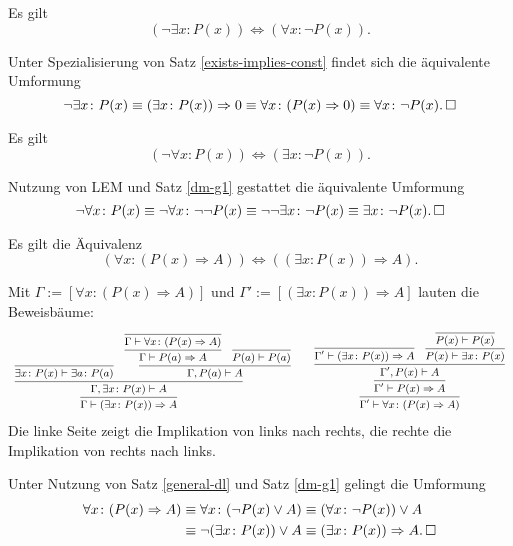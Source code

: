 \begin{Satz}%
\label{dm-g1} Es gilt
\[(\neg\exists x\colon P(x))\iff (\forall x\colon \neg P(x)).\]
\end{Satz}
\begin{Beweis} Unter Spezialisierung von Satz \ref{exists-implies-const}
findet sich die äquivalente Umformung%
\[\neg\exists x\colon P(x)\equiv (\exists x\colon P(x))\Rightarrow 0
\equiv \forall x\colon (P(x)\Rightarrow 0)
\equiv \forall x\colon \neg P(x).\,\square\]
\end{Beweis}
\begin{Satz}%
\label{dm-g2} Es gilt
\[(\neg\forall x\colon P(x))\iff (\exists x\colon \neg P(x)).\]
\end{Satz}
\begin{Beweis}
Nutzung von LEM und Satz \ref{dm-g1} gestattet die äquivalente
Umformung%
\[\neg\forall x\colon P(x)
\equiv\neg\forall x\colon \neg\neg P(x)
\equiv\neg\neg\exists x\colon \neg P(x)
\equiv\exists x\colon \neg P(x).\,\square\]
\end{Beweis}

\begin{Satz}\label{exists-implies-const}
Es gilt die Äquivalenz
\[(\forall x\colon (P(x)\Rightarrow A))
\iff ((\exists x\colon P(x))\Rightarrow A).\]
\end{Satz}
\begin{Beweis}[Beweis 1] Mit $\Gamma:=[\forall x\colon (P(x)\Rightarrow A)]$
und $\Gamma':=[(\exists x\colon P(x))\Rightarrow A]$
lauten die Beweisbäume:
\[\begin{array}{c@{\qquad}c}\small
\infer{\Gamma\vdash (\exists x\colon P(x))\Rightarrow A}{
  \infer{\Gamma,\exists x\colon P(x)\vdash A}{
    \infer{\exists x\colon P(x)\vdash\exists a\colon P(a)}{}
  & \infer{\Gamma,P(a)\vdash A}{
      \infer{\Gamma\vdash P(a)\Rightarrow A}{
        \infer{\Gamma\vdash\forall x\colon (P(x)\Rightarrow A)}{}}
    & \infer{P(a)\vdash P(a)}{}}}}
&\small
\infer{\Gamma'\vdash\forall x\colon (P(x)\Rightarrow A)}{
  \infer{\Gamma'\vdash P(x)\Rightarrow A}{
    \infer{\Gamma',P(x)\vdash A}{
      \infer{\Gamma'\vdash (\exists x\colon P(x))\Rightarrow A}{}
    & \infer{P(x)\vdash \exists x\colon P(x)}{
        \infer{P(x)\vdash P(x)}{}}}}}
\end{array}
\]
Die linke Seite zeigt die Implikation von links nach rechts,
die rechte die Implikation von rechts nach links.\,\qedsymbol
\end{Beweis}
\begin{Beweis}
Unter Nutzung von Satz \ref{general-dl}
und Satz \ref{dm-g1} gelingt die Umformung
\begin{align*}
\forall x\colon (P(x)\Rightarrow A)
&\equiv \forall x\colon (\neg P(x)\lor A)
\equiv (\forall x\colon \neg P(x))\lor A\\
&\equiv \neg (\exists x\colon P(x))\lor A
\equiv (\exists x\colon P(x))\Rightarrow A.\,\square
\end{align*}
\end{Beweis}

